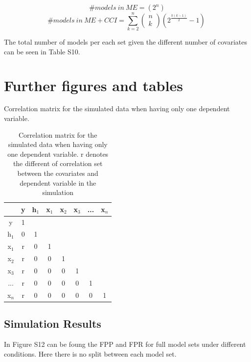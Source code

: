 \[\#models\ in\ ME=\left(2^n\right)\] 
\[\#models\ in\ ME+CCI=\sum^n_{k=2}{\left( \begin{array}{c}
n \\ 
k \end{array}
\right)}\left(2^{\frac{k\left(k-1\right)}{2}}-1\right)\ \]  

The total number of models per each set given the different number of covariates can be seen in Table S10.



\section{Further figures and tables}
Correlation matrix for the simulated data when having only one dependent variable. 

\begin{table}[H]
\caption{}
\centering
\caption*{Correlation matrix for the simulated data when having only one dependent variable. r denotes the different of correlation set between the covariates and dependent variable in the simulation}
\begin{tabular}{c|ccccccc} 
\toprule
 & y & h${}_{1}$ & x${}_{1}$ & x${}_{2}$ & x${}_{3}$ & ... & x${}_{n}$ \\ 
 \midrule
y & 1 &  &  &  &  &  &  \\ 
h${}_{1}$ & 0 & 1 &  &  &  &  &  \\ 
x${}_{1}$ & r & 0 & 1 &  &  &  &  \\  
x${}_{2}$ & r & 0 & 0 & 1 &  &  &  \\  
x${}_{3}$ & r & 0 & 0 & 0 & 1 &  &  \\  
... & r & 0 & 0 & 0 & 0 & 1 &  \\ 
x${}_{n}$ & r & 0 & 0 & 0 & 0 & 0 & 1 \\ 
\bottomrule
\end{tabular}
\end{table}

\subsection{Simulation Results}
In Figure S12 can be foung the FPP and FPR for full model sets under different conditions. Here there is no split between each model set.





